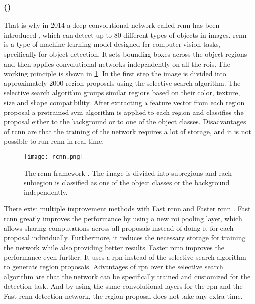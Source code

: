 \subsubsection{ ()}
\label{sssec:rcnn}
That is why in 2014 a deep convolutional network called \gls{rcnn} has been introduced \cite{Girshick2014}, which can detect up to 80 different types of objects in images.
\gls{rcnn} is a type of machine learning model designed for computer vision tasks, specifically for object detection.
It sets bounding boxes across the object regions and then applies convolutional networks independently on all the \glspl{roi}.
The working principle is shown in \cref{fig:rcnn}.
In the first step the image is divided into approximately 2000 region proposals using the selective search algorithm.
The selective search algorithm groups similar regions based on their color, texture, size and shape compatibility.
After extracting a feature vector from each region proposal a pretrained \gls{svm} algorithm is applied to each region and classifies the proposal either to the background or to one of the object classes.
Disadvantages of \gls{rcnn} are that the training of the network requires a lot of storage, and it is not possible to run \gls{rcnn} in real time.
\begin{figure}[htbp]
	\centering
	\texttt{[image: rcnn.png]}
	\caption[\acrshort{rcnn} framework]{The \acrshort{rcnn} framework \cite{Girshick2014}. The image is divided into subregions and each subregion is classified as one of the object classes or the background independently.}
	\label{fig:rcnn}
\end{figure}
There exist multiple improvement methods with Fast \gls{rcnn} \cite{Girshick2015} and Faster \gls{rcnn} \cite{Ren2017}.
Fast \gls{rcnn} greatly improves the performance by using a new \gls{roi} pooling layer, which allows sharing computations across all proposals instead of doing it for each proposal individually.
Furthermore, it reduces the necessary storage for training the network while also providing better results.
Faster \gls{rcnn} improves the performance even further.
It uses a \gls{rpn} instead of the selective search algorithm to generate region proposals.
Advantages of \gls{rpn} over the selective search algorithm are that the network can be specifically trained and customized for the detection task.
And by using the same convolutional layers for the \gls{rpn} and the Fast \gls{rcnn} detection network, the region proposal does not take any extra time.\par
